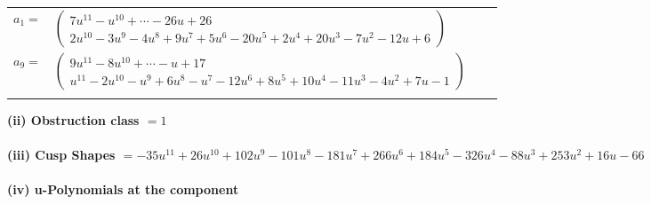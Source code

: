 \documentclass[1p]{elsarticle_modified}
\theoremstyle{definition}
\begin{document}
\begin{tabular}{m{7pt} m{180pt} m{7pt} m{180pt} }
\flushright $a_{1}=$&$\begin{pmatrix}7 u^{11}- u^{10}+\cdots-26 u+26\\2 u^{10}-3 u^9-4 u^8+9 u^7+5 u^6-20 u^5+2 u^4+20 u^3-7 u^2-12 u+6\end{pmatrix}$ \\
\flushright $a_{9}=$&$\begin{pmatrix}9 u^{11}-8 u^{10}+\cdots- u+17\\u^{11}-2 u^{10}- u^9+6 u^8- u^7-12 u^6+8 u^5+10 u^4-11 u^3-4 u^2+7 u-1\end{pmatrix}$\\&\end{tabular}
\flushleft \textbf{(ii) Obstruction class $= 1$}\\~\\
\flushleft \textbf{(iii) Cusp Shapes $= -35 u^{11}+26 u^{10}+102 u^9-101 u^8-181 u^7+266 u^6+184 u^5-326 u^4-88 u^3+253 u^2+16 u-66$}\\~\\
\newpage\renewcommand{\arraystretch}{1}
\flushleft \textbf{(iv) u-Polynomials at the component}\newline \\
\end{document}
